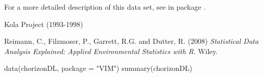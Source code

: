 \begin{Format}
\begin{description}
\end{description}

\end{Format}
%
\begin{Note}\relax
For a more detailed description of this data set, see 
 in package .
\end{Note}
%
\begin{Source}\relax
Kola Project (1993-1998)
\end{Source}
%
\begin{References}\relax
Reimann, C., Filzmoser, P., Garrett, R.G. and Dutter, R. (2008) 
\emph{Statistical Data Analysis Explained: Applied Environmental
Statistics with R}. Wiley.
\end{References}
%
\begin{SeeAlso}\relax
{}
\end{SeeAlso}
%
\begin{Examples}
\begin{ExampleCode}
data(chorizonDL, package = "VIM")
summary(chorizonDL)
\end{ExampleCode}
\end{Examples}
